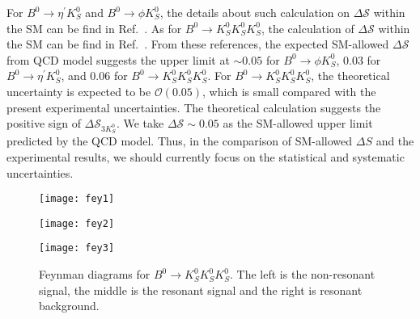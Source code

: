 For $B^0 \to \eta^{'} K^0_S$ and $B^0 \to \phi K^0_S$, the details about such calculation on $\Delta \mathcal{S}$ within the SM can be find in Ref.~\cite{Beneke_2003}. As for $B^0 \to K_S^0  K_S^0  K_S^0$, the calculation of $\Delta \mathcal{S}$ within the SM can be find in Ref.~\cite{PhysRevD.72.094003}. From these references, the expected SM-allowed $\Delta \mathcal{S}$ from QCD model suggests the upper limit at $\sim 0.05$ for $B^0 \to \phi K^0_S$, $0.03$ for $B^0 \to \eta^{'} K^0_S$, and $0.06$ for $B^0 \to K_S^0  K_S^0  K_S^0$. For $B^0 \to K_S^0  K_S^0  K_S^0$, the theoretical uncertainty is expected to be $\mathcal{O}(0.05)$, which is small compared with the present experimental uncertainties.  The theoretical calculation suggests the positive sign of $\Delta \mathcal{S}_{3K^0_S}$. We take $\Delta \mathcal{S} \sim 0.05$ as the SM-allowed upper limit predicted by the QCD model. Thus, in the comparison of SM-allowed $\Delta S$ and the experimental results, we should currently focus on the statistical and systematic uncertainties.


 \begin{figure}[htpb]
 	\centering
	\begin{minipage}[t]{0.32\linewidth}
		\texttt{[image: fey1]}
	\end{minipage}
	\begin{minipage}[t]{0.32\linewidth}
		\texttt{[image: fey2]}
	\end{minipage}
\begin{minipage}[t]{0.32\linewidth}
	\texttt{[image: fey3]}
\end{minipage}
	\caption{Feynman diagrams for $B^0 \to K_S^0  K_S^0  K_S^0$. The left is the non-resonant signal, the middle is the resonant signal and the right is resonant background.}
	\label{fig:3ksfey}
\end{figure}

